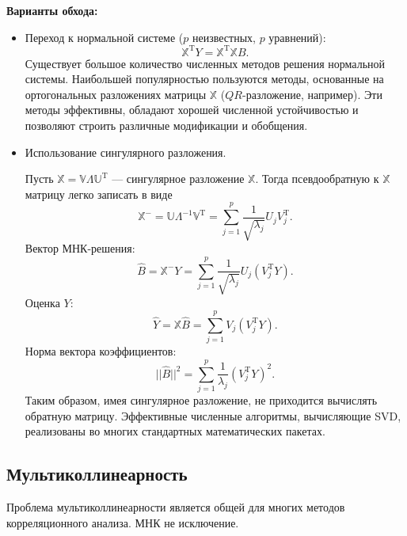 \documentclass[11pt,colorlinks=true]{article}
\begin{document}
\textbf{Варианты обхода:}
\begin{itemize}
\item Переход к нормальной системе ($p$ неизвестных, $p$ уравнений):
\begin{equation*}
\mathbb{X}^{\mathrm{T}}Y=
\mathbb{X}^{\mathrm{T}}\mathbb{X}B.
\end{equation*}
Существует большое количество численных методов решения нормальной системы. Наибольшей популярностью пользуются методы, основанные на ортогональных
разложениях матрицы $\mathbb{X}$ ($QR$-разложение, например). Эти методы эффективны, обладают хорошей численной устойчивостью и позволяют строить различные модификации и обобщения.
\item Использование сингулярного разложения.

Пусть $\mathbb{X}=\mathbb{V}\mathbb{\Lambda}\mathbb{U^{\mathrm{T}}}$ --- сингулярное разложение $\mathbb{X}$.
Тогда псевдообратную к $\mathbb{X}$ матрицу легко записать в виде
\begin{equation*}
\mathbb{X}^{-}
=
\mathbb{U}\mathbb{\Lambda}^{-1}\mathbb{V}^{\mathrm{T}}
=
\sum_{j=1}^{p}
\frac{1}{\sqrt{\lambda_{j}}}
U_{j}V_{j}^{\mathrm{T}}.
\end{equation*}
Вектор МНК-решения:
\begin{equation}\label{eq:B_SVD}
\hat{B}=\mathbb{X}^{-}Y
=
\sum_{j=1}^{p}
\frac{1}{\sqrt{\lambda_{j}}}
U_{j}(V_{j}^{\mathrm{T}}Y).
\end{equation}
Оценка $Y$:
\begin{equation}\label{eq:Y_SVD}
\hat{Y}
=
\mathbb{X}\hat{B}
=
\sum_{j=1}^{p}
V_{j}(V_{j}^{\mathrm{T}}Y).
\end{equation}
Норма вектора коэффициентов:
\begin{equation}\label{eq:||B||_SVD}
||\hat{B}||^{2}
=
\sum_{j=1}^{p}
\frac{1}{\lambda_{j}}(V_{j}^{\mathrm{T}}Y)^{2}.
\end{equation}
Таким образом, имея сингулярное разложение, не приходится вычислять обратную матрицу. Эффективные численные алгоритмы, вычисляющие SVD, реализованы
во многих стандартных математических пакетах.
\end{itemize}


\subsection{Мультиколлинеарность}

Проблема мультиколлинеарности является общей для многих методов корреляционного анализа. МНК не исключение. 
\end{document}
